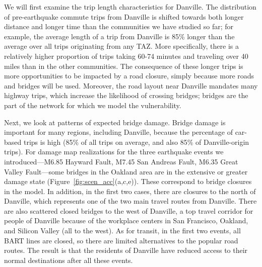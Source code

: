 
We will first examine the trip length characteristics for Danville. %
The distribution of pre-earthquake commute trips from Danville is shifted towards both longer distance and longer time than the communities we have studied so far; for example, the average length of a trip from Danville is 85\% longer than the average over all trips originating from any TAZ. More specifically, there is a relatively higher proportion of trips taking 60-74 minutes and traveling over 40 miles than in the other communities. The consequence of these longer trips is more opportunities to be impacted by a road closure, simply because more roads and bridges will be used. Moreover, the road layout near Danville mandates many highway trips, which increase the likelihood of crossing bridges; bridges are the part of the network for which we model the vulnerability. 


Next, we look at patterns of expected bridge damage. Bridge damage is important for many regions, including Danville, because the percentage of car-based trips is high (85\% of all trips on average, and also 85\% of Danville-origin trips). For damage map realizations for the three  earthquake events we introduced---M6.85 Hayward Fault, M7.45 San Andreas Fault, M6.35 Great Valley Fault---some bridges in the Oakland area are in the extensive or greater damage state (Figure~\ref{fig:scen_acc}{(a,c,e)}). These correspond to bridge closures in the model. In addition, in the first two cases, there are closures to the north of Danville, which represents one of the two main travel routes from Danville. There are also scattered closed bridges to the west of Danville, a top travel corridor for people of Danville because of the workplace centers in San Francisco, Oakland, and Silicon Valley (all to the west). As for transit, in the first two events, all BART lines are closed, so there are limited alternatives to the popular road routes. The result is that the residents of Danville have reduced access to their normal destinations after all these events. 

